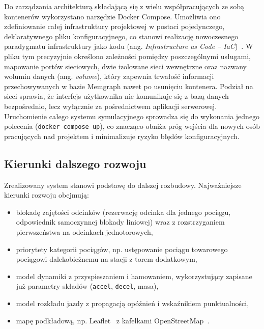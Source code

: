 \documentclass[twoside]{projektInzynierskiMS1z}
\begin{document}
Do zarządzania architekturą składającą się z wielu współpracujących ze sobą kontenerów
wykorzystano narzędzie Docker Compose. Umożliwia ono zdefiniowanie całej infrastruktury
projektowej w postaci pojedynczego, deklaratywnego pliku konfiguracyjnego, co stanowi
realizację nowoczesnego paradygmatu infrastruktury jako kodu (ang. \emph{Infrastructure
as Code -- IaC})~\cite{infrastructureascode}. W pliku tym precyzyjnie określono zależności pomiędzy poszczególnymi usługami,
mapowanie portów sieciowych, dwie izolowane sieci wewnętrzne oraz nazwany
wolumin danych (ang. \emph{volume}), który zapewnia trwałość informacji
przechowywanych w bazie Memgraph nawet po usunięciu kontenera. Podział na sieci
sprawia, że interfejs użytkownika nie komunikuje się z bazą danych
bezpośrednio, lecz wyłącznie za pośrednictwem aplikacji serwerowej.
Uruchomienie całego systemu symulacyjnego sprowadza się do wykonania jednego
polecenia (\texttt{docker compose up}), co znacząco obniża próg wejścia dla
nowych osób pracujących nad projektem i minimalizuje ryzyko błędów
konfiguracyjnych.



\subsection*{Kierunki dalszego rozwoju}

Zrealizowany system stanowi podstawę do dalszej rozbudowy. Najważniejsze
kierunki rozwoju obejmują:

\begin{itemize}
\item blokadę zajętości odcinków (rezerwację odcinka dla jednego pociągu,
  odpowiednik samoczynnej blokady liniowej) wraz z rozstrzyganiem pierwszeństwa
  na odcinkach jednotorowych,
\item priorytety kategorii pociągów, np. ustępowanie pociągu towarowego
  pociągowi dalekobieżnemu na stacji z torem dodatkowym,
\item model dynamiki z przyspieszaniem i hamowaniem, wykorzystujący zapisane
  już parametry składów (\texttt{accel}, \texttt{decel}, masa),
\item model rozkładu jazdy z propagacją opóźnień i wskaźnikiem punktualności,
\item mapę podkładową, np. Leaflet~\cite{leaflet} z kafelkami
  OpenStreetMap~\cite{openstreetmap}.
\end{itemize}
\end{document}
